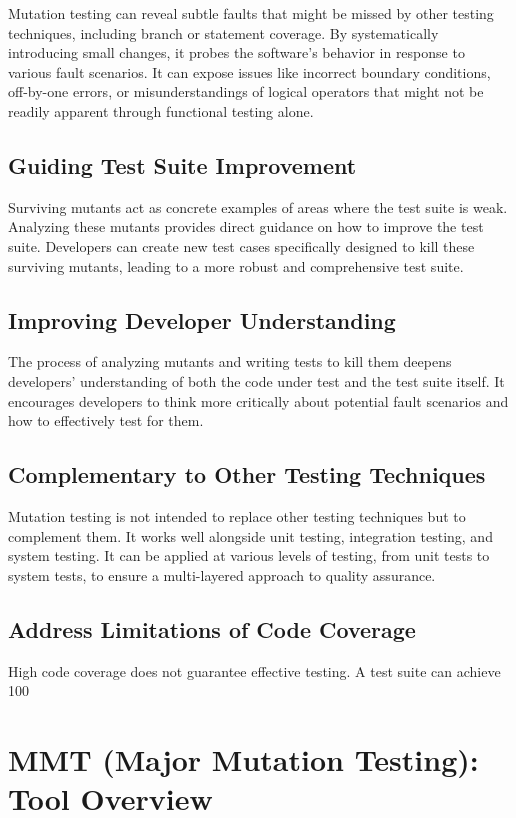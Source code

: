 \documentclass[sigplan, nonacm]{acmart}
\begin{document}
Mutation testing can reveal subtle faults that might be missed by other testing techniques, including branch or statement coverage. By systematically introducing small changes, it probes the software's behavior in response to various fault scenarios.
It can expose issues like incorrect boundary conditions, off-by-one errors, or misunderstandings of logical operators that might not be readily apparent through functional testing alone.
\subsection{Guiding Test Suite Improvement}

Surviving mutants act as concrete examples of areas where the test suite is weak. Analyzing these mutants provides direct guidance on how to improve the test suite.
Developers can create new test cases specifically designed to kill these surviving mutants, leading to a more robust and comprehensive test suite.
\subsection{Improving Developer Understanding}

The process of analyzing mutants and writing tests to kill them deepens developers' understanding of both the code under test and the test suite itself.
It encourages developers to think more critically about potential fault scenarios and how to effectively test for them.
\subsection{Complementary to Other Testing Techniques}

Mutation testing is not intended to replace other testing techniques but to complement them. It works well alongside unit testing, integration testing, and system testing.
It can be applied at various levels of testing, from unit tests to system tests, to ensure a multi-layered approach to quality assurance.
\subsection{Address Limitations of Code Coverage}

High code coverage does not guarantee effective testing. A test suite can achieve 100%
\section{MMT (Major Mutation Testing): Tool Overview}
\end{document}
